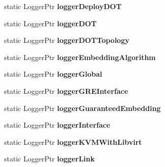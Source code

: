 \begin{DoxyCompactItemize}
\item 
\hypertarget{classLoggerFactory_a370883e64dd49f7f6d75544680ab250d}{static \-Logger\-Ptr {\bfseries logger\-Deploy\-D\-O\-T}}\label{classLoggerFactory_a370883e64dd49f7f6d75544680ab250d}

\item 
\hypertarget{classLoggerFactory_a82991a1adc93ea3114e42b395ddcdc20}{static \-Logger\-Ptr {\bfseries logger\-D\-O\-T}}\label{classLoggerFactory_a82991a1adc93ea3114e42b395ddcdc20}

\item 
\hypertarget{classLoggerFactory_a3ad6b5a640f0149dfe748f958ce7f31e}{static \-Logger\-Ptr {\bfseries logger\-D\-O\-T\-Topology}}\label{classLoggerFactory_a3ad6b5a640f0149dfe748f958ce7f31e}

\item 
\hypertarget{classLoggerFactory_a46b0b28bdca2cdbd2dc197c6b6ae352c}{static \-Logger\-Ptr {\bfseries logger\-Embedding\-Algorithm}}\label{classLoggerFactory_a46b0b28bdca2cdbd2dc197c6b6ae352c}

\item 
\hypertarget{classLoggerFactory_a4b724e3ec36481b1a5c6052ed5d835fa}{static \-Logger\-Ptr {\bfseries logger\-Global}}\label{classLoggerFactory_a4b724e3ec36481b1a5c6052ed5d835fa}

\item 
\hypertarget{classLoggerFactory_a03a74412cf666586a3163a385b8f8eda}{static \-Logger\-Ptr {\bfseries logger\-G\-R\-E\-Interface}}\label{classLoggerFactory_a03a74412cf666586a3163a385b8f8eda}

\item 
\hypertarget{classLoggerFactory_a1382f9e360cfde731fb48f89dfafc987}{static \-Logger\-Ptr {\bfseries logger\-Guaranteed\-Embedding}}\label{classLoggerFactory_a1382f9e360cfde731fb48f89dfafc987}

\item 
\hypertarget{classLoggerFactory_a8099c8a48728d7f2ccde37a4b909c5e3}{static \-Logger\-Ptr {\bfseries logger\-Interface}}\label{classLoggerFactory_a8099c8a48728d7f2ccde37a4b909c5e3}

\item 
\hypertarget{classLoggerFactory_a550c8eed9cdb235dbea4414f5da4fb98}{static \-Logger\-Ptr {\bfseries logger\-K\-V\-M\-With\-Libvirt}}\label{classLoggerFactory_a550c8eed9cdb235dbea4414f5da4fb98}

\item 
\hypertarget{classLoggerFactory_a83df9ec3f62d04fc5ce11b19eea1bb80}{static \-Logger\-Ptr {\bfseries logger\-Link}}\label{classLoggerFactory_a83df9ec3f62d04fc5ce11b19eea1bb80}


\end{DoxyCompactItemize}
